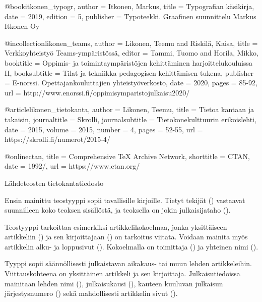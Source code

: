 \begin{esimerkki}
\begin{koodilohko}
  @book{itkonen_typogr,
    author = {Itkonen, Markus},
    title = {Typografian käsikirja},
    date = {2019},
    edition = {5},
    publisher = {Typoteekki. Graafinen suunnittelu Markus Itkonen Oy}
  }

  @incollection{likonen_teams,
    author = {Likonen, Teemu and Riskilä, Kaisa},
    title = {Verkkoyhteistyö Teams-ympäristössä},
    editor = {Tammi, Tuomo and Horila, Mikko},
    booktitle = {Oppimis- ja toimintaympäristöjen kehittäminen
      harjoittelukouluissa II},
    booksubtitle = {Tilat ja tekniikka pedagogisen kehittämisen tukena},
    publisher = {E-norssi. Opettajankouluttajien yhteistyöverkosto},
    date = {2020},
    pages = {85-92},
    url = {http://www.enorssi.fi/oppimisymparistojulkaisu2020/}
  }

  @article{likonen_tietokanta,
    author = {Likonen, Teemu},
    title = {Tietoa kantaan ja takaisin},
    journaltitle = {Skrolli},
    journalsubtitle = {Tietokonekulttuurin erikoislehti},
    date = {2015},
    volume = {2015},
    number = {4},
    pages = {52-55},
    url = {https://skrolli.fi/numerot/2015-4/}
  }

  @online{ctan,
    title = {Comprehensive TeX Archive Network},
    shorttitle = {CTAN},
    date = {1992/},
    url = {https://www.ctan.org/}
  }
\end{koodilohko}
\caption{Lähdeteosten tietokantatiedosto}
\label{esim:bib-tiedosto}
\end{esimerkki}

Ensin mainittu%
 teostyyppi  sopii tavallisille kirjoille.
Tietyt tekijät () vastaavat suunnilleen koko teoksen
sisällöstä, ja teoksella on jokin julkaisijataho ().

Teostyyppi%
  tarkoittaa esimerkiksi
artikkelikokoelmaa, jonka yksittäiseen artikkeliin () ja
sen kirjoittajaan () on tarkoitus viitata. Voidaan mainita
myös artikkelin alku- ja loppusivut (). Kokoelmalla on
toimittaja () ja yhteinen nimi ().

Tyyppi%
  sopii säännöllisesti julkaistavan
aikakaus- tai muun lehden artikkeleihin. Viittauskohteena on yksittäinen
artikkeli ja sen kirjoittaja. Julkaisutiedoissa mainitaan lehden nimi
(), julkaisukausi (), kauteen
kuuluvan julkaisun järjestysnumero () sekä mahdollisesti
artikkelin sivut ().

